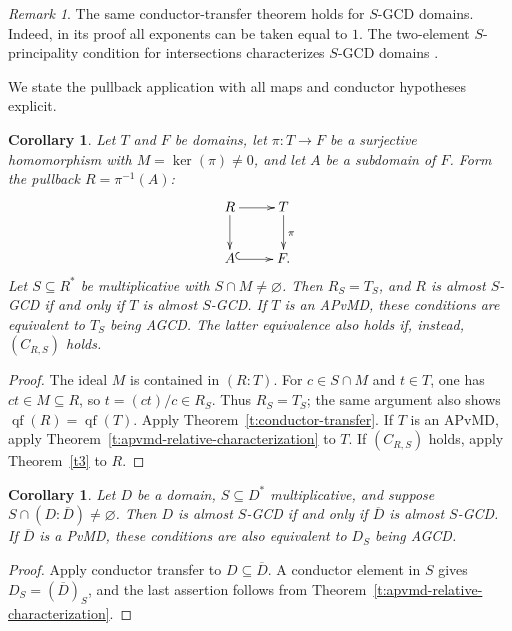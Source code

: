 \documentclass[11pt]{amsart}
\newtheorem{corollary}[theorem]{Corollary}
\theoremstyle{definition}
\theoremstyle{remark}
\newtheorem{remark}[theorem]{Remark}
\DeclareMathOperator{\qf}{qf}
\begin{document}
\begin{remark}\label{r:conductor-S-GCD}
The same conductor-transfer theorem holds for $S$-GCD domains.
Indeed, in its proof all exponents can be taken equal to $1$.
The two-element $S$-principality condition for intersections
characterizes $S$-GCD domains \cite[Theorem~2.1]{AHZ}.
\end{remark}

We state the pullback application with all maps and conductor
hypotheses explicit.

\begin{corollary}\label{p:milnor-meets-M}
Let $T$ and $F$ be domains, let $\pi:T\to F$ be a surjective
homomorphism with $M=\ker(\pi)\ne0$, and let $A$ be a subdomain
of $F$. Form the pullback $R=\pi^{-1}(A)$:
\[
 \xymatrix{
 R \ar[r] \ar[d] & T \ar[d]^{\pi}\\
 A \ar@{^{(}->}[r] & F .
 }
\]
Let $S\subseteq R^\ast$ be multiplicative with $S\cap M\ne\varnothing$.
Then $R_S=T_S$, and $R$ is almost $S$-GCD if and only if $T$ is
almost $S$-GCD.
If $T$ is an APvMD, these conditions are equivalent to $T_S$
being AGCD. The latter equivalence also holds if, instead,
$(C_{R,S})$ holds.
\end{corollary}

\begin{proof}
The ideal $M$ is contained in $(R:T)$.
For $c\in S\cap M$ and $t\in T$, one has $ct\in M\subseteq R$,
so $t=(ct)/c\in R_S$. Thus $R_S=T_S$; the same argument also
shows $\qf(R)=\qf(T)$.
Apply Theorem~\ref{t:conductor-transfer}. If $T$ is an APvMD,
apply Theorem~\ref{t:apvmd-relative-characterization} to $T$.
If $(C_{R,S})$ holds, apply Theorem~\ref{t3} to $R$.
\end{proof}

\begin{corollary}\label{c:normalization-conductor}
Let $D$ be a domain, $S\subseteq D^\ast$ multiplicative, and
suppose $S\cap(D:\overline D)\ne\varnothing$.
Then $D$ is almost $S$-GCD if and only if $\overline D$ is almost
$S$-GCD. If $\overline D$ is a PvMD, these conditions are also
equivalent to $D_S$ being AGCD.
\end{corollary}

\begin{proof}
Apply conductor transfer to $D\subseteq\overline D$.
A conductor element in $S$ gives
$D_S=(\overline D)_S$, and the last assertion follows from
Theorem~\ref{t:apvmd-relative-characterization}.
\end{proof}
\end{document}
